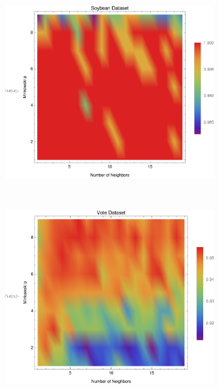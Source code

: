 \documentclass{article}
\begin{document}
\begin{figure}[h!]
\begin{subfigure}[b]{0.32\textwidth}
					\includegraphics[width=\textwidth]{figs/kNN/soybean_plot_kp}	
					\caption{}
					\label{kp_soybean}				
				\end{subfigure} \	
				\begin{subfigure}[b]{0.32\textwidth}
					\centering
					\includegraphics[width=\textwidth]{figs/kNN/vote_plot_kp}	
					\caption{}
					\label{kp_vote}				
				\end{subfigure} \	
				\begin{subfigure}[b]{0.32\textwidth}
					\centering

\end{subfigure}
\end{figure}
\end{document}
